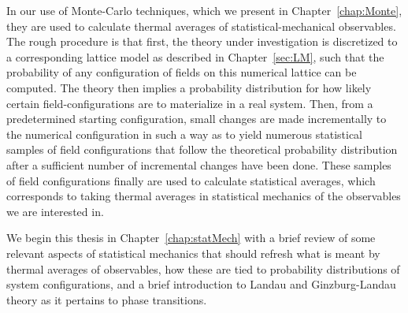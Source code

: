 In our use of Monte-Carlo techniques, which we present in Chapter~\ref{chap:Monte}, they are used
to calculate thermal averages of statistical-mechanical
observables. The rough procedure is that first, the theory under investigation is discretized to a corresponding lattice model as described in Chapter~\ref{sec:LM},
such that the probability of any configuration of fields on this numerical lattice can be computed. The theory then implies a probability distribution for how
likely certain field-configurations are to materialize in a real system.
Then, from a predetermined starting configuration, small changes are made incrementally to the numerical configuration in such
a way as to yield numerous statistical samples of field configurations that follow the theoretical probability distribution after a sufficient number of
incremental changes have been done. These samples of field configurations finally are used to calculate statistical averages, which corresponds to taking
thermal averages in statistical mechanics of the observables we are interested in. 

We begin this thesis in Chapter~\ref{chap:statMech} with a brief review
of some relevant aspects of statistical mechanics that should refresh what is meant by thermal averages of observables, how these are tied to probability
distributions of system configurations, and a brief introduction to Landau and Ginzburg-Landau theory as it pertains to phase transitions.


